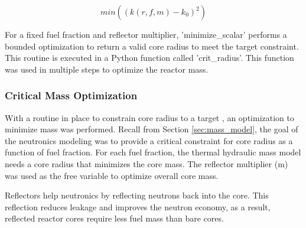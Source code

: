 \begin{equation}
    min( (k(r, f, m) - k_0)^2 )
\end{equation}

For a fixed fuel fraction and reflector multiplier, 'minimize_scalar' performs a
bounded optimization to return a valid core radius to meet the target \keff
constraint. This routine is executed in a Python function called 'crit_radius'.
This function was used in multiple steps to optimize the reactor mass.

\subsubsection{Critical Mass Optimization}
With a routine in place to constrain core radius to a target \keff, an
optimization to minimize mass was performed. Recall from Section
\ref{sec:mass_model}, the goal of the neutronics modeling was to provide a
critical constraint for core radius as a function of fuel fraction. For each
fuel fraction, the thermal hydraulic mass model needs a core radius that
minimizes the core mass. The reflector multiplier (m) was used as the free
variable to optimize overall core mass. 

Reflectors help neutronics by reflecting neutrons back into the core. This
reflection reduces leakage and improves the neutron economy, as a result,
reflected reactor cores require less fuel mass than bare cores. 
